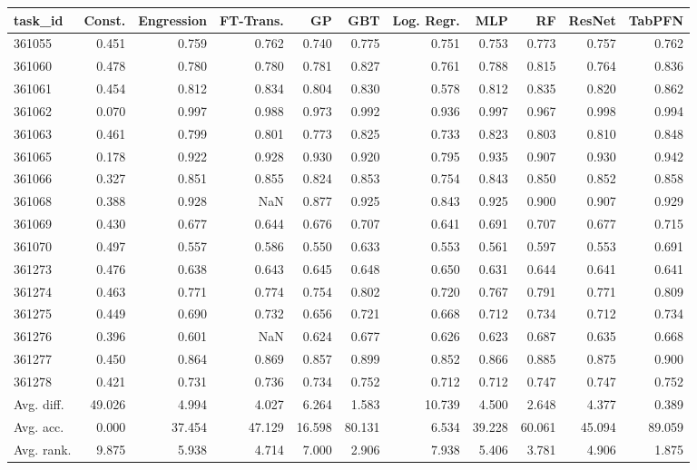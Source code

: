 \begin{tabular}{lrrrrrrrrrr}
\toprule
task\_id & Const. & Engression & FT-Trans. & GP & GBT & Log. Regr. & MLP & RF & ResNet & TabPFN \\
\midrule
361055 & 0.451 & 0.759 & 0.762 & 0.740 & 0.775 & 0.751 & 0.753 & 0.773 & 0.757 & 0.762 \\
361060 & 0.478 & 0.780 & 0.780 & 0.781 & 0.827 & 0.761 & 0.788 & 0.815 & 0.764 & 0.836 \\
361061 & 0.454 & 0.812 & 0.834 & 0.804 & 0.830 & 0.578 & 0.812 & 0.835 & 0.820 & 0.862 \\
361062 & 0.070 & 0.997 & 0.988 & 0.973 & 0.992 & 0.936 & 0.997 & 0.967 & 0.998 & 0.994 \\
361063 & 0.461 & 0.799 & 0.801 & 0.773 & 0.825 & 0.733 & 0.823 & 0.803 & 0.810 & 0.848 \\
361065 & 0.178 & 0.922 & 0.928 & 0.930 & 0.920 & 0.795 & 0.935 & 0.907 & 0.930 & 0.942 \\
361066 & 0.327 & 0.851 & 0.855 & 0.824 & 0.853 & 0.754 & 0.843 & 0.850 & 0.852 & 0.858 \\
361068 & 0.388 & 0.928 & NaN & 0.877 & 0.925 & 0.843 & 0.925 & 0.900 & 0.907 & 0.929 \\
361069 & 0.430 & 0.677 & 0.644 & 0.676 & 0.707 & 0.641 & 0.691 & 0.707 & 0.677 & 0.715 \\
361070 & 0.497 & 0.557 & 0.586 & 0.550 & 0.633 & 0.553 & 0.561 & 0.597 & 0.553 & 0.691 \\
361273 & 0.476 & 0.638 & 0.643 & 0.645 & 0.648 & 0.650 & 0.631 & 0.644 & 0.641 & 0.641 \\
361274 & 0.463 & 0.771 & 0.774 & 0.754 & 0.802 & 0.720 & 0.767 & 0.791 & 0.771 & 0.809 \\
361275 & 0.449 & 0.690 & 0.732 & 0.656 & 0.721 & 0.668 & 0.712 & 0.734 & 0.712 & 0.734 \\
361276 & 0.396 & 0.601 & NaN & 0.624 & 0.677 & 0.626 & 0.623 & 0.687 & 0.635 & 0.668 \\
361277 & 0.450 & 0.864 & 0.869 & 0.857 & 0.899 & 0.852 & 0.866 & 0.885 & 0.875 & 0.900 \\
361278 & 0.421 & 0.731 & 0.736 & 0.734 & 0.752 & 0.712 & 0.712 & 0.747 & 0.747 & 0.752 \\
Avg. diff. & 49.026 & 4.994 & 4.027 & 6.264 & 1.583 & 10.739 & 4.500 & 2.648 & 4.377 & 0.389 \\
Avg. acc. & 0.000 & 37.454 & 47.129 & 16.598 & 80.131 & 6.534 & 39.228 & 60.061 & 45.094 & 89.059 \\
Avg. rank. & 9.875 & 5.938 & 4.714 & 7.000 & 2.906 & 7.938 & 5.406 & 3.781 & 4.906 & 1.875 \\
\bottomrule
\end{tabular}
